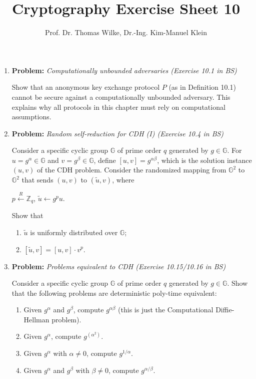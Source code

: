 \documentclass[11pt]{article}
\begin{document}
	
	\title{\textbf{Cryptography Exercise Sheet 10}}
	\author{Prof. Dr. Thomas Wilke, Dr.-Ing. Kim-Manuel Klein}
	\maketitle
	\medskip
	
	\begin{enumerate}
		
		\item
		\textbf{Problem:} \textit{Computationally unbounded adversaries (Exercise 10.1 in BS)}
		
		Show that an anonymous key exchange
		protocol $P$ (as in Definition 10.1) cannot be secure against a computationally unbounded adversary.
		This explains why all protocols in this chapter must rely on computational assumptions.
		
		
		\item
		\textbf{Problem:} \textit{Random self-reduction for CDH (I) (Exercise 10.4 in BS)}
		
		Consider a specific cyclic group $\mathbb{G}$ of prime order
		$q$ generated by $g \in \mathbb{G}$. For $u = g^\alpha \in \mathbb{G}$ and  $v=g^{\beta} \in \mathbb{G}$, define $[u, v] = g^{\alpha\beta}$, which is the solution instance $(u, v)$ of the CDH problem. Consider the randomized mapping from $\mathbb{G}^2$ to $\mathbb{G}^2$ that sends
		$(u, v)$ to $(\tilde{u}, v)$, where
		\begin{center}
			 $p \xleftarrow{R} \mathbb{Z}_q$, $\tilde{u} \xleftarrow{} g^p u$.
		\end{center}
		Show that 
		
		\begin{enumerate}
			\item $\tilde{u}$ is uniformly distributed over $\mathbb{G}$;
			\item $[\tilde{u}, v] = [u,v] \cdot v^p$.
		\end{enumerate}
		
		
		\item
		\textbf{Problem:} \textit{Problems equivalent to CDH (Exercise 10.15/10.16 in BS)}
		
		Consider a specific cyclic group $\mathbb{G}$ of prime order $q$ generated by $g \in \mathbb{G}$. Show that the following problems are deterministic poly-time equivalent:
		\begin{enumerate}
			\item Given $g^{\alpha}$ and $g^{\beta}$, compute $g^{\alpha\beta}$ (this is just the Computational Diffie-Hellman problem).
			\item Given $g^{\alpha}$, compute $g^{(\alpha^2)}$.
			\item Given $g^{\alpha}$ with $\alpha \ne 0$, compute $g^{1/\alpha}$.
			\item Given $g^{\alpha}$ and $g^{\beta}$ with $\beta \ne 0$, compute $g^{\alpha/\beta}$.
			

\end{enumerate}
\end{enumerate}
\end{document}
